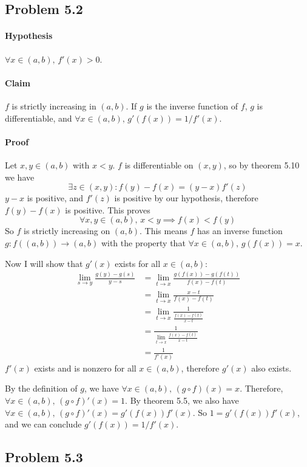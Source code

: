 \documentclass[11pt,letterpaper]{article}
\begin{document}
\subsection*{Problem 5.2}
\paragraph{Hypothesis} $\forall x \in (a,b),\, f'(x)>0$. 
\paragraph{Claim} $f$ is strictly increasing in $(a,b)$. If $g$ is the inverse function of $f$, $g$ is differentiable, and $\forall x \in (a,b),\, g'(f(x)) = 1/f'(x)$. 
\paragraph{Proof} Let $x,y \in (a,b)$ with $x<y$. $f$ is differentiable on $(x,y)$, so by theorem 5.10 we have
\[ \exists z \in (x,y) : f(y)-f(x)=(y-x)f'(z) \]
$y-x$ is positive, and $f'(z)$ is positive by our hypothesis, therefore $f(y)-f(x)$ is positive. This proves
\[ \forall x,y \in (a,b),\, x < y \implies f(x)<f(y) \]
So $f$ is strictly increasing on $(a,b)$. This means $f$ has an inverse function $g: f((a,b)) \rightarrow (a,b)$ with the property that $\forall x \in (a,b),\, g(f(x)) = x$. 

Now I will show that $g'(x)$ exists for all $x \in (a,b)$:
\begin{align*}
\lim_{s \rightarrow y}\frac{g(y)-g(s)}{y-s} &= \lim_{t \rightarrow x}\frac{g(f(x))-g(f(t))}{f(x)-f(t)} \\
&= \lim_{t \rightarrow x}\frac{x-t}{f(x)-f(t)} \\
&= \lim_{t \rightarrow x}\frac{1}{\frac{f(x)-f(t)}{x-t}} \\
&= \frac{1}{\lim_{t \rightarrow x}\frac{f(x)-f(t)}{x-t}} \\
&= \frac{1}{f'(x)}
\end{align*}
$f'(x)$ exists and is nonzero for all $x \in (a,b)$, therefore $g'(x)$ also exists. 

By the definition of $g$, we have $\forall x\in(a,b),\, (g \circ f)(x)=x$. Therefore,  $\forall x\in(a,b),\, (g \circ f)'(x)=1$. By theorem 5.5, we also have $\forall x\in(a,b),\, (g \circ f)'(x)=g'(f(x))f'(x)$. So $1 = g'(f(x))f'(x)$, and we can conclude $g'(f(x))=1/f'(x)$.

\subsection*{Problem 5.3}
\end{document}
